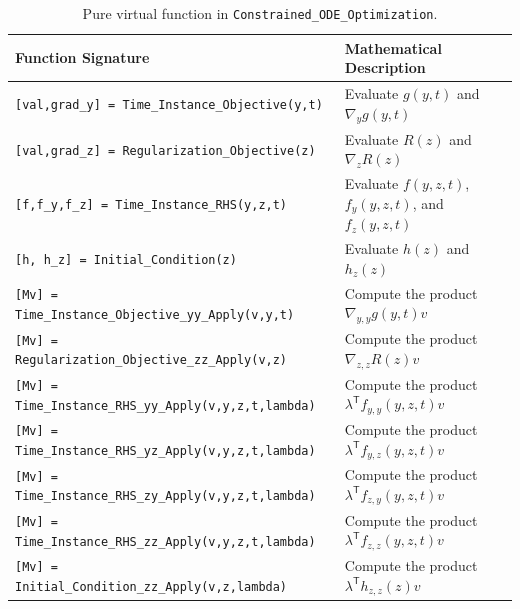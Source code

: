 \documentclass{article}
\newcommand{\trp}{^{\mathsf{T}}}
\begin{document}
\begin{table}[!ht]
\centering
\begin{tabular}{|l|l|}
    \hline
    Function Signature & Mathematical Description
    \\ \hline
    \texttt{[val,grad\_y] = Time\_Instance\_Objective(y,t)}
    & Evaluate $g(y,t)$ and $\nabla_y g(y,t)$
    \\
    \texttt{[val,grad\_z] = Regularization\_Objective(z)}
    & Evaluate $R(z)$ and $\nabla_z R(z)$
    \\
    \texttt{[f,f\_y,f\_z] = Time\_Instance\_RHS(y,z,t)}
    & Evaluate $f(y,z,t)$, $f_y(y,z,t)$, and $f_z(y,z,t)$
    \\
    \texttt{[h, h\_z] = Initial\_Condition(z)}
    & Evaluate $h(z)$ and $h_z(z)$
    \\
    \texttt{[Mv] = Time\_Instance\_Objective\_yy\_Apply(v,y,t)}
    & Compute the product $\nabla_{y,y} g(y,t) v$
    \\
    \texttt{[Mv] = Regularization\_Objective\_zz\_Apply(v,z)}
    & Compute the product $\nabla_{z,z} R(z) v$
    \\
    \texttt{[Mv] = Time\_Instance\_RHS\_yy\_Apply(v,y,z,t,lambda)}
    & Compute the product $\lambda\trp f_{y,y}(y,z,t) v$
    \\
    \texttt{[Mv]  = Time\_Instance\_RHS\_yz\_Apply(v,y,z,t,lambda)}
    & Compute the product $\lambda\trp f_{y,z}(y,z,t) v$
    \\
    \texttt{[Mv]  = Time\_Instance\_RHS\_zy\_Apply(v,y,z,t,lambda)}
    & Compute the product $\lambda\trp f_{z,y}(y,z,t) v$
    \\
    \texttt{[Mv]  = Time\_Instance\_RHS\_zz\_Apply(v,y,z,t,lambda)}
    & Compute the product $\lambda\trp f_{z,z}(y,z,t) v$
    \\
    \texttt{[Mv]  = Initial\_Condition\_zz\_Apply(v,z,lambda)}
    & Compute the product $\lambda\trp h_{z,z}(z) v$
    \\ \hline
\end{tabular}
\caption{Pure virtual function in \texttt{Constrained\_ODE\_Optimization}.}
\label{tab:con_ode_opt_pure_virtual_funs_1}
\end{table}
\end{document}

